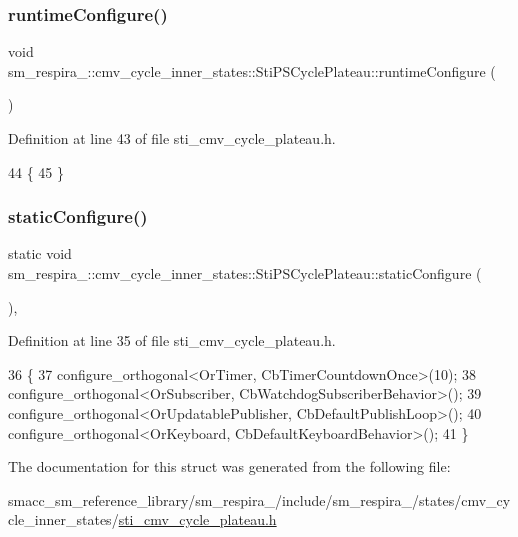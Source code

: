 \subsubsection{\texorpdfstring{runtime\+Configure()}{runtimeConfigure()}}
{\footnotesize\ttfamily void sm\+\_\+respira\+\_\+::cmv\+\_\+cycle\+\_\+inner\+\_\+states\+::\+Sti\+P\+S\+Cycle\+Plateau\+::runtime\+Configure (\begin{DoxyParamCaption}{ }\end{DoxyParamCaption})\hspace{0.3cm}{\ttfamily [inline]}}



Definition at line 43 of file sti\+\_\+cmv\+\_\+cycle\+\_\+plateau.\+h.


\begin{DoxyCode}
44   \{
45   \}
\end{DoxyCode}
\mbox{\label{structsm__respira__1_1_1cmv__cycle__inner__states_1_1StiPSCyclePlateau_a55007b606d7d8091c80642f240313ef1}} 
\subsubsection{\texorpdfstring{static\+Configure()}{staticConfigure()}}
{\footnotesize\ttfamily static void sm\+\_\+respira\+\_\+::cmv\+\_\+cycle\+\_\+inner\+\_\+states\+::\+Sti\+P\+S\+Cycle\+Plateau\+::static\+Configure (\begin{DoxyParamCaption}{ }\end{DoxyParamCaption})\hspace{0.3cm}{\ttfamily [inline]}, {\ttfamily [static]}}



Definition at line 35 of file sti\+\_\+cmv\+\_\+cycle\+\_\+plateau.\+h.


\begin{DoxyCode}
36   \{
37     configure\_orthogonal<OrTimer, CbTimerCountdownOnce>(10);
38     configure\_orthogonal<OrSubscriber, CbWatchdogSubscriberBehavior>();
39     configure\_orthogonal<OrUpdatablePublisher, CbDefaultPublishLoop>();
40     configure\_orthogonal<OrKeyboard, CbDefaultKeyboardBehavior>();
41   \}
\end{DoxyCode}


The documentation for this struct was generated from the following file\+:\begin{DoxyCompactItemize}
\item 
smacc\+\_\+sm\+\_\+reference\+\_\+library/sm\+\_\+respira\+\_/include/sm\+\_\+respira\+\_/states/cmv\+\_\+cycle\+\_\+inner\+\_\+states/\hyperlink{sti__cmv__cycle__plateau_8h}{sti\+\_\+cmv\+\_\+cycle\+\_\+plateau.\+h}\end{DoxyCompactItemize}
